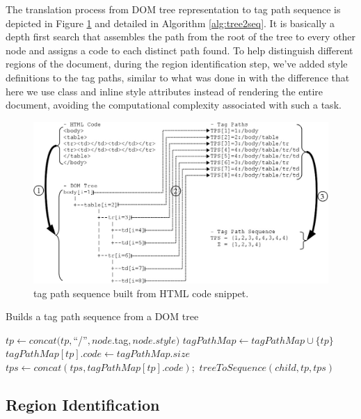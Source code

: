 \documentclass{vldb}
\begin{document}
The translation process from DOM tree representation to tag path sequence is
depicted in Figure \ref{fig:tree2seq} and detailed in Algorithm
\ref{alg:tree2seq}. It is basically a depth first search that assembles the path
from the root of the tree to every other node and assigns a code to each
distinct path found. To help distinguish different regions of the document,
during the region identification step, we've added style definitions to the tag
paths, similar to what was done in \cite{clustVX2014} with the difference that
here we use class and inline style attributes instead of rendering the entire
document, avoiding the computational complexity associated with such a task.

\begin{figure}[h]
  \centering
     \includegraphics[width=\columnwidth]{img/tree2seq.jpg}
  \caption{tag path sequence built from HTML code snippet.}
  \label{fig:tree2seq}
\end{figure}

\begin{algorithm}[H]
\caption{Builds a tag path sequence from a DOM tree}
\label{alg:tree2seq}
\begin{algorithmic}[1]
\State $tp \leftarrow concat(tp,$``/''$,node.$tag$,node.style)$
\State $tagPathMap \leftarrow tagPathMap \cup \{tp\}$ 
\State $tagPathMap[tp].code \leftarrow tagPathMap.size$ 
\EndIf 
\State $tps \leftarrow concat(tps,tagPathMap[tp].code);$
\State $treeToSequence(child,tp,tps)$ 
\EndFor 
\EndProcedure
\end{algorithmic}
\end{algorithm}



\subsection{Region Identification}\label{ss:regi}
\end{document}
